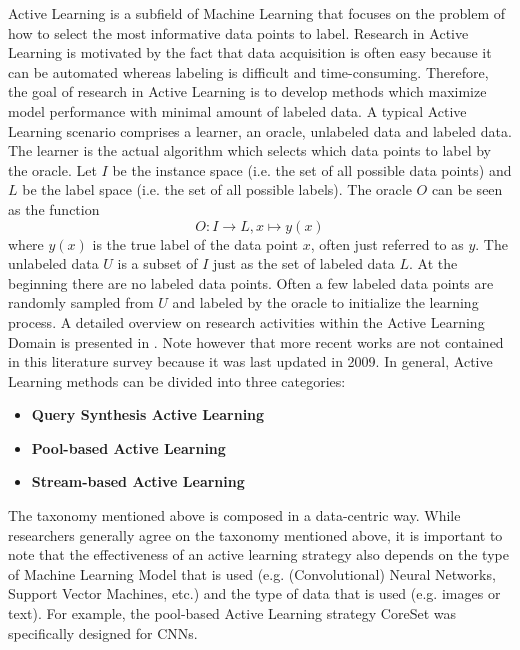 Active Learning is a subfield of Machine Learning that focuses on the problem of how to select the most informative data points to label.
Research in Active Learning is motivated by the fact that data acquisition is often easy because it can be automated whereas labeling is
difficult and time-consuming. Therefore, the goal of research in Active Learning is to develop methods which maximize model performance
with minimal amount of labeled data. A typical Active Learning scenario comprises a learner, an oracle, unlabeled data and labeled data.
The learner is the actual algorithm which selects which data points to label by the oracle. Let $I$ be the instance space (i.e. the set
of all possible data points) and $L$ be the label space (i.e. the set of all possible labels). The oracle $O$ can be seen as the function
\begin{equation}
    O: I \rightarrow L, x \mapsto y(x)
\end{equation}
where $y(x)$ is the true label of the data point $x$, often just referred to as $y$. The unlabeled data $U$ is a subset of $I$ just as the set
of labeled data $L$. At the beginning there are no labeled data points. Often a few labeled data points are randomly sampled from $U$ and labeled
by the oracle to initialize the learning process. A detailed overview on research activities within the Active Learning Domain is presented in
\cite{settles2009active}. Note however that more recent works are not contained in this literature survey because it was last updated in 2009.
In general, Active Learning methods can be divided into three categories:
\begin{itemize}
    \item \textbf{Query Synthesis Active Learning}
    \item \textbf{Pool-based Active Learning}
    \item \textbf{Stream-based Active Learning}
\end{itemize}
The taxonomy mentioned above is composed in a data-centric way. While researchers generally agree on the taxonomy mentioned above,
it is important to note that the effectiveness of an active learning strategy also depends on the type of Machine Learning Model that is used
(e.g. (Convolutional) Neural Networks, Support Vector Machines, etc.) and the type of data that is used (e.g. images or text).
For example, the pool-based Active Learning strategy CoreSet \cite{sener2017active} was specifically designed for CNNs.

